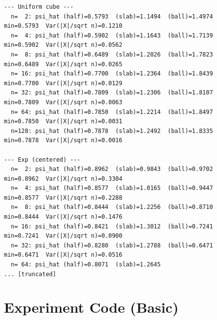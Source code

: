 \documentclass[11pt]{article}
\begin{document}
\begin{lstlisting}
--- Uniform cube ---
  n=  2: psi_hat (half)=0.5793  (slab)=1.1494  (ball)=1.4974  min=0.5793  Var(|X|/sqrt n)=0.1210
  n=  4: psi_hat (half)=0.5902  (slab)=1.1643  (ball)=1.7139  min=0.5902  Var(|X|/sqrt n)=0.0562
  n=  8: psi_hat (half)=0.6489  (slab)=1.2026  (ball)=1.7823  min=0.6489  Var(|X|/sqrt n)=0.0265
  n= 16: psi_hat (half)=0.7700  (slab)=1.2364  (ball)=1.8439  min=0.7700  Var(|X|/sqrt n)=0.0129
  n= 32: psi_hat (half)=0.7809  (slab)=1.2306  (ball)=1.8107  min=0.7809  Var(|X|/sqrt n)=0.0063
  n= 64: psi_hat (half)=0.7850  (slab)=1.2214  (ball)=1.8497  min=0.7850  Var(|X|/sqrt n)=0.0031
  n=128: psi_hat (half)=0.7878  (slab)=1.2492  (ball)=1.8335  min=0.7878  Var(|X|/sqrt n)=0.0016

--- Exp (centered) ---
  n=  2: psi_hat (half)=0.8962  (slab)=0.9843  (ball)=0.9702  min=0.8962  Var(|X|/sqrt n)=0.3304
  n=  4: psi_hat (half)=0.8577  (slab)=1.0165  (ball)=0.9447  min=0.8577  Var(|X|/sqrt n)=0.2288
  n=  8: psi_hat (half)=0.8444  (slab)=1.2256  (ball)=0.8710  min=0.8444  Var(|X|/sqrt n)=0.1476
  n= 16: psi_hat (half)=0.8421  (slab)=1.3012  (ball)=0.7241  min=0.7241  Var(|X|/sqrt n)=0.0900
  n= 32: psi_hat (half)=0.8280  (slab)=1.2788  (ball)=0.6471  min=0.6471  Var(|X|/sqrt n)=0.0516
  n= 64: psi_hat (half)=0.8071  (slab)=1.2645  
... [truncated]
\end{lstlisting}


\section{Experiment Code (Basic)}
\end{document}
